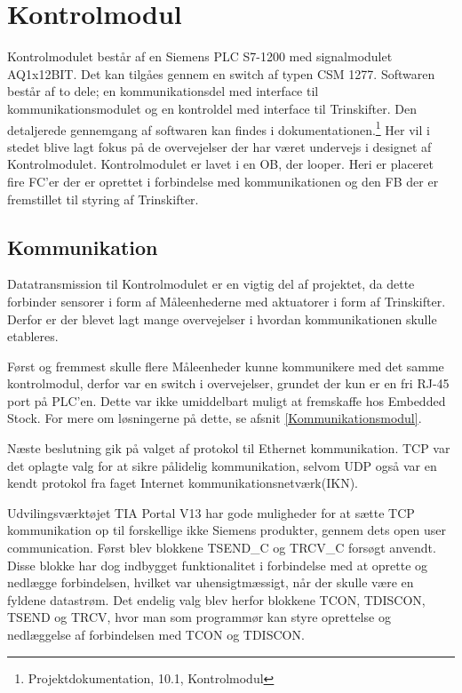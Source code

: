 
\section{Kontrolmodul}

Kontrolmodulet består af en Siemens PLC S7-1200 med signalmodulet AQ1x12BIT. Det kan tilgåes gennem en switch af typen CSM 1277.
Softwaren består af to dele; en kommunikationsdel med interface til kommunikationsmodulet og en kontroldel med interface til Trinskifter. Den detaljerede gennemgang af softwaren kan findes i dokumentationen.\footnote{Projektdokumentation, 10.1, Kontrolmodul} Her vil i stedet blive lagt fokus på de overvejelser der har været undervejs i designet af Kontrolmodulet.
Kontrolmodulet er lavet i en OB, der looper. Heri er placeret fire FC'er der er oprettet i forbindelse med kommunikationen og den FB der er fremstillet til styring af Trinskifter.

\subsection{Kommunikation}
Datatransmission til Kontrolmodulet er en vigtig del af projektet, da dette forbinder sensorer i form af Måleenhederne med aktuatorer i form af Trinskifter. Derfor er der blevet lagt mange overvejelser i hvordan kommunikationen skulle etableres.


Først og fremmest skulle flere Måleenheder kunne kommunikere med det samme kontrolmodul, derfor var en switch i overvejelser, grundet der kun er en fri RJ-45 port på PLC'en. Dette var ikke umiddelbart muligt at fremskaffe hos Embedded Stock. For mere om løsningerne på dette, se afsnit \ref{Kommunikationsmodul}.


Næste beslutning gik på valget af protokol til Ethernet kommunikation. TCP var det oplagte valg for at sikre pålidelig kommunikation, selvom UDP også var en kendt protokol fra faget Internet kommunikationsnetværk(IKN).


Udvilingsværktøjet TIA Portal V13 har gode muligheder for at sætte TCP kommunikation op til forskellige ikke Siemens produkter, gennem dets open user communication. Først blev blokkene TSEND\_C og TRCV\_C forsøgt anvendt. Disse blokke har dog indbygget funktionalitet i forbindelse med at oprette og nedlægge forbindelsen, hvilket var uhensigtmæssigt, når der skulle være en fyldene datastrøm. Det endelig valg blev herfor blokkene TCON, TDISCON, TSEND og TRCV, hvor man som programmør kan styre oprettelse og nedlæggelse af forbindelsen med TCON og TDISCON.



